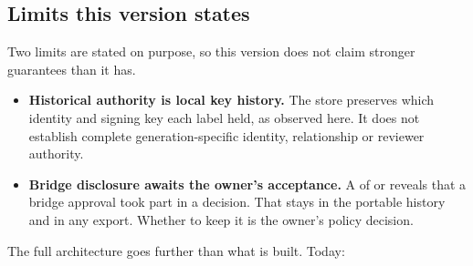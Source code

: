 \subsection{Limits this version states}

Two limits are stated on purpose, so this version does not claim stronger
guarantees than it has.

\begin{itemize}[leftmargin=1.5em]
  \item \textbf{Historical authority is local key history.} The store
  preserves which identity and signing key each label held, as observed
  here. It does not establish complete generation-specific identity,
  relationship or reviewer authority.
  \item \textbf{Bridge disclosure awaits the owner's acceptance.} A
   of  or 
  reveals that a bridge approval took part in a decision. That stays in the
  portable history and in any export. Whether to keep it is the owner's
  policy decision.
\end{itemize}

The full architecture goes further than what is built. Today:


